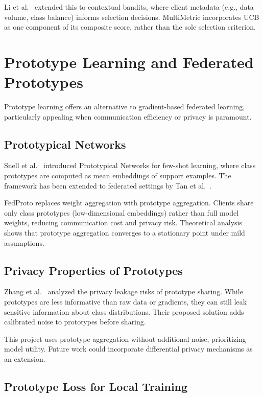 Li et al.~\citep{li2022contextual} extended this to contextual bandits, where client metadata (e.g., data volume, class balance) informs selection decisions. MultiMetric incorporates UCB as one component of its composite score, rather than the sole selection criterion.

\section{Prototype Learning and Federated Prototypes}

Prototype learning offers an alternative to gradient-based federated learning, particularly appealing when communication efficiency or privacy is paramount.

\subsection{Prototypical Networks}

Snell et al.~\citep{snell2017prototypical} introduced Prototypical Networks for few-shot learning, where class prototypes are computed as mean embeddings of support examples. The framework has been extended to federated settings by Tan et al.~\citep{tan2022fedproto}.

FedProto \citep{tan2022fedproto} replaces weight aggregation with prototype aggregation. Clients share only class prototypes (low-dimensional embeddings) rather than full model weights, reducing communication cost and privacy risk. Theoretical analysis shows that prototype aggregation converges to a stationary point under mild assumptions.

\subsection{Privacy Properties of Prototypes}

Zhang et al.~\citep{zhang2022protpriv} analyzed the privacy leakage risks of prototype sharing. While prototypes are less informative than raw data or gradients, they can still leak sensitive information about class distributions. Their proposed solution adds calibrated noise to prototypes before sharing.

This project uses prototype aggregation without additional noise, prioritizing model utility. Future work could incorporate differential privacy mechanisms as an extension.

\subsection{Prototype Loss for Local Training}

